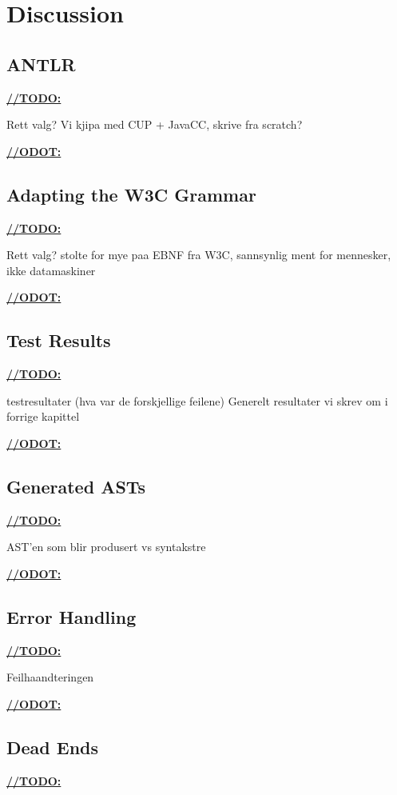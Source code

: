 \chapter{Discussion}

\section{ANTLR}
\underline{\textbf{\LARGE //TODO:}}

Rett valg?
Vi kjipa med CUP + JavaCC, skrive fra scratch?

\underline{\textbf{\LARGE //ODOT:}}

\section{Adapting the W3C Grammar}
\underline{\textbf{\LARGE //TODO:}}

Rett valg?
stolte for mye paa EBNF fra W3C, sannsynlig ment for mennesker, ikke datamaskiner

\underline{\textbf{\LARGE //ODOT:}}


\section{Test Results}

\underline{\textbf{\LARGE //TODO:}}

testresultater (hva var de forskjellige feilene)
Generelt resultater vi skrev om i forrige kapittel

\underline{\textbf{\LARGE //ODOT:}}

\section{Generated ASTs}
\underline{\textbf{\LARGE //TODO:}}

AST'en som blir produsert vs syntakstre

\underline{\textbf{\LARGE //ODOT:}}

\section{Error Handling}
\underline{\textbf{\LARGE //TODO:}}

Feilhaandteringen

\underline{\textbf{\LARGE //ODOT:}}

\section{Dead Ends}
\underline{\textbf{\LARGE //TODO:}}

